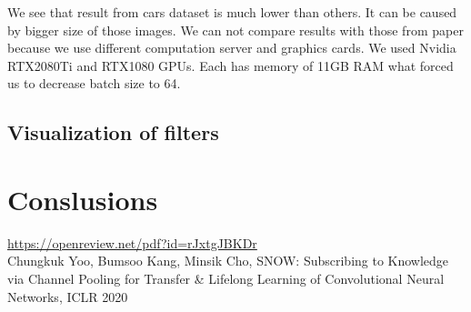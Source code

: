 \documentclass[12pt]{article}
\begin{document}
    We see that result from cars dataset is much lower than others.
    It can be caused by bigger size of those images.
    We can not compare results with those from paper because we use different computation server and graphics cards.
    We used Nvidia RTX2080Ti and RTX1080 GPUs. Each has memory of 11GB RAM what forced us to decrease batch size to 64.

    \subsection{Visualization of filters}



    \section{Conslusions}

    \begin{thebibliography}{99}
         \href{https://openreview.net/pdf?id=rJxtgJBKDr}{https://openreview.net/pdf?id=rJxtgJBKDr} \\
        Chungkuk Yoo, Bumsoo Kang, Minsik Cho, SNOW: Subscribing to Knowledge via Channel Pooling for Transfer \& Lifelong Learning of Convolutional Neural Networks, ICLR 2020
    \end{thebibliography}
\end{document}
